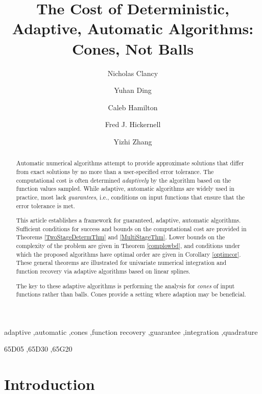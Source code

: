 \documentclass[]{elsarticle}
\theoremstyle{definition}
\theoremstyle{remark}
\begin{document}
\begin{frontmatter}

\title{The Cost of Deterministic, Adaptive, Automatic Algorithms:  Cones, Not Balls}
\author{Nicholas Clancy}
\author{Yuhan Ding}
\author{Caleb Hamilton}
\author{Fred J. Hickernell}
\author{Yizhi Zhang}
\address{Room E1-208, Department of Applied Mathematics, Illinois Institute of Technology,\\ 10 W.\ 32$^{\text{nd}}$ St., Chicago, IL 60616}

\begin{abstract} 
Automatic numerical algorithms attempt to provide approximate solutions that differ from exact solutions by no more than a user-specified error tolerance. The computational cost is often determined \emph{adaptively} by the algorithm based on the function values sampled. While adaptive, automatic algorithms are widely used in practice, most lack \emph{guarantees}, i.e., conditions on input functions that ensure that the error tolerance is met. 

This article establishes a framework for guaranteed, adaptive, automatic algorithms. Sufficient conditions for success and bounds on the computational cost are provided in Theorems \ref{TwoStageDetermThm} and \ref{MultiStageThm}.  Lower bounds on the complexity of the problem are given in Theorem \ref{complowbd}, and conditions under which the proposed algorithms have optimal order are given in Corollary \ref{optimcor}. These general theorems are illustrated for univariate numerical integration and function recovery via adaptive algorithms based on linear splines.  

The key to these adaptive algorithms is performing the analysis for \emph{cones} of input functions rather than balls.  Cones provide a setting where adaption may be beneficial.
\end{abstract}

\begin{keyword}
adaptive \sep automatic \sep cones \sep function recovery \sep guarantee \sep integration \sep quadrature

\MSC[2010] 65D05 \sep 65D30 \sep 65G20

\end{keyword}
\end{frontmatter}

\section{Introduction}
\end{document}
